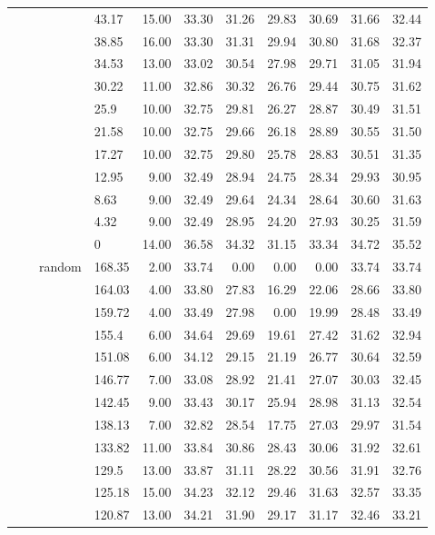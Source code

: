\begin{longtable}{llllrrrrrrr}
   &  &  & 43.17 & 15.00 & 33.30 & 31.26 & 29.83 & 30.69 & 31.66 & 32.44 \\ 
   &  &  & 38.85 & 16.00 & 33.30 & 31.31 & 29.94 & 30.80 & 31.68 & 32.37 \\ 
   &  &  & 34.53 & 13.00 & 33.02 & 30.54 & 27.98 & 29.71 & 31.05 & 31.94 \\ 
   &  &  & 30.22 & 11.00 & 32.86 & 30.32 & 26.76 & 29.44 & 30.75 & 31.62 \\ 
   &  &  & 25.9 & 10.00 & 32.75 & 29.81 & 26.27 & 28.87 & 30.49 & 31.51 \\ 
   &  &  & 21.58 & 10.00 & 32.75 & 29.66 & 26.18 & 28.89 & 30.55 & 31.50 \\ 
   &  &  & 17.27 & 10.00 & 32.75 & 29.80 & 25.78 & 28.83 & 30.51 & 31.35 \\ 
   &  &  & 12.95 & 9.00 & 32.49 & 28.94 & 24.75 & 28.34 & 29.93 & 30.95 \\ 
   &  &  & 8.63 & 9.00 & 32.49 & 29.64 & 24.34 & 28.64 & 30.60 & 31.63 \\ 
   &  &  & 4.32 & 9.00 & 32.49 & 28.95 & 24.20 & 27.93 & 30.25 & 31.59 \\ 
   &  &  & 0 & 14.00 & 36.58 & 34.32 & 31.15 & 33.34 & 34.72 & 35.52 \\ 
   &  & random & 168.35 & 2.00 & 33.74 & 0.00 & 0.00 & 0.00 & 33.74 & 33.74 \\ 
   &  &  & 164.03 & 4.00 & 33.80 & 27.83 & 16.29 & 22.06 & 28.66 & 33.80 \\ 
   &  &  & 159.72 & 4.00 & 33.49 & 27.98 & 0.00 & 19.99 & 28.48 & 33.49 \\ 
   &  &  & 155.4 & 6.00 & 34.64 & 29.69 & 19.61 & 27.42 & 31.62 & 32.94 \\ 
   &  &  & 151.08 & 6.00 & 34.12 & 29.15 & 21.19 & 26.77 & 30.64 & 32.59 \\ 
   &  &  & 146.77 & 7.00 & 33.08 & 28.92 & 21.41 & 27.07 & 30.03 & 32.45 \\ 
   &  &  & 142.45 & 9.00 & 33.43 & 30.17 & 25.94 & 28.98 & 31.13 & 32.54 \\ 
   &  &  & 138.13 & 7.00 & 32.82 & 28.54 & 17.75 & 27.03 & 29.97 & 31.54 \\ 
   &  &  & 133.82 & 11.00 & 33.84 & 30.86 & 28.43 & 30.06 & 31.92 & 32.61 \\ 
   &  &  & 129.5 & 13.00 & 33.87 & 31.11 & 28.22 & 30.56 & 31.91 & 32.76 \\ 
   &  &  & 125.18 & 15.00 & 34.23 & 32.12 & 29.46 & 31.63 & 32.57 & 33.35 \\ 
   &  &  & 120.87 & 13.00 & 34.21 & 31.90 & 29.17 & 31.17 & 32.46 & 33.21 \\ 

\end{longtable}
